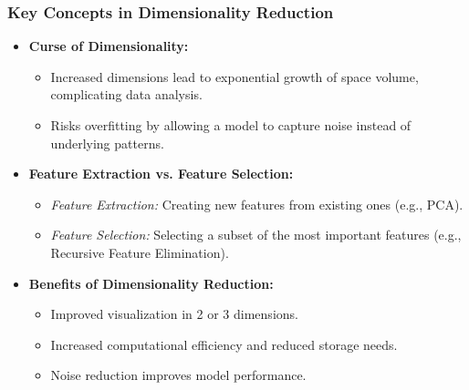 \documentclass[aspectratio=169]{beamer}
\begin{document}
\begin{frame}[fragile]
    \frametitle{Key Concepts in Dimensionality Reduction}
    \begin{itemize}
        \item \textbf{Curse of Dimensionality:}
        \begin{itemize}
            \item Increased dimensions lead to exponential growth of space volume, complicating data analysis.
            \item Risks overfitting by allowing a model to capture noise instead of underlying patterns.
        \end{itemize}
        
        \item \textbf{Feature Extraction vs. Feature Selection:}
        \begin{itemize}
            \item \textit{Feature Extraction:} Creating new features from existing ones (e.g., PCA).
            \item \textit{Feature Selection:} Selecting a subset of the most important features (e.g., Recursive Feature Elimination).
        \end{itemize}
        
        \item \textbf{Benefits of Dimensionality Reduction:}
        \begin{itemize}
            \item Improved visualization in 2 or 3 dimensions.
            \item Increased computational efficiency and reduced storage needs.
            \item Noise reduction improves model performance.
        \end{itemize}
    \end{itemize}
\end{frame}
\end{document}

